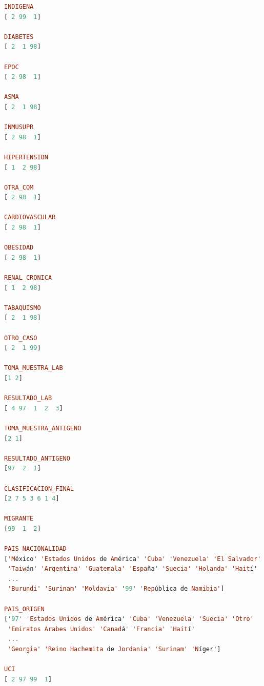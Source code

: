 \begin{lstlisting}[language=haskell, caption=Valores por columna, captionpos=b, label=lst:fiboHaskell]
INDIGENA
[ 2 99  1]

DIABETES
[ 2  1 98]

EPOC
[ 2 98  1]

ASMA
[ 2  1 98]

INMUSUPR
[ 2 98  1]

HIPERTENSION
[ 1  2 98]

OTRA_COM
[ 2 98  1]

CARDIOVASCULAR
[ 2 98  1]

OBESIDAD
[ 2 98  1]

RENAL_CRONICA
[ 1  2 98]

TABAQUISMO
[ 2  1 98]

OTRO_CASO
[ 2  1 99]

TOMA_MUESTRA_LAB
[1 2]

RESULTADO_LAB
[ 4 97  1  2  3]

TOMA_MUESTRA_ANTIGENO
[2 1]

RESULTADO_ANTIGENO
[97  2  1]

CLASIFICACION_FINAL
[2 7 5 3 6 1 4]

MIGRANTE
[99  1  2]

PAIS_NACIONALIDAD
['México' 'Estados Unidos de América' 'Cuba' 'Venezuela' 'El Salvador'
 'Taiwán' 'Argentina' 'Guatemala' 'España' 'Suecia' 'Holanda' 'Haití'
 ...
 'Burundi' 'Surinam' 'Moldavia' '99' 'República de Namibia']

PAIS_ORIGEN
['97' 'Estados Unidos de América' 'Cuba' 'Venezuela' 'Suecia' 'Otro'
 'Emiratos Arabes Unidos' 'Canadá' 'Francia' 'Haití'
 ...
 'Georgia' 'Reino Hachemita de Jordania' 'Surinam' 'Níger']

UCI
[ 2 97 99  1]


\end{lstlisting}

\clearpage

